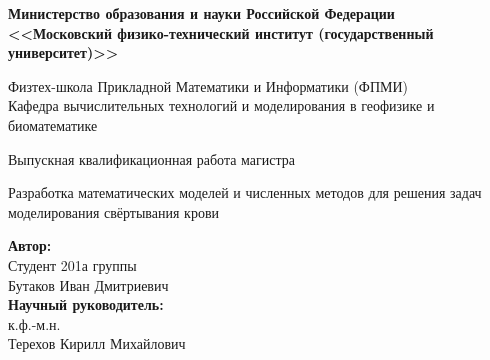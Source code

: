 \fontsize{10}{12}\selectfont

\begin{center}
    \large\textbf{Министерство образования и науки Российской Федерации \\
    <<Московский физико-технический институт (государственный
    университет)>>} \\
    \vspace{1cm}

    Физтех-школа Прикладной Математики и Информатики (ФПМИ) \\

    Кафедра вычислительных технологий и моделирования в геофизике и биоматематике \\

    \vspace{3em}

    Выпускная квалификационная работа магистра
\end{center}

\begin{center}
    \vspace{\fill}
    \LARGE{Разработка математических моделей и численных методов для решения задач моделирования свёртывания крови}

    \vspace{\fill}
\end{center}


\begin{flushright}
    \textbf{Автор:} \\
    Студент 201а группы \\
    Бутаков Иван Дмитриевич \\
    \vspace{2em}
    \textbf{Научный руководитель:} \\
    к.ф.-м.н. \\
    Терехов Кирилл Михайлович \\
\end{flushright}

\vspace{\fill}

